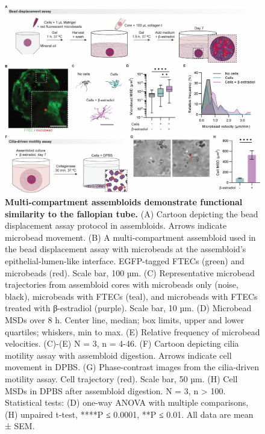 \begin{refsection}
    \begin{figure}[p]
        \begin{center}
            \includegraphics[width=1\textwidth,height=0.85\textheight,keepaspectratio,clip,page=1]{figures/chapter4/fig_4.jpg}
            \captionsetup{font=small}
            \caption{\textbf{Multi-compartment assembloids demonstrate functional similarity to the fallopian tube.} (A) Cartoon depicting the bead displacement assay protocol in assembloids. Arrows indicate microbead movement. (B) A multi-compartment assembloid used in the bead displacement assay with microbeads at the assembloid’s epithelial-lumen-like interface. EGFP-tagged FTECs (green) and microbeads (red). Scale bar, 100 µm. (C) Representative microbead trajectories from assembloid cores with microbeads only (noise, black), microbeads with FTECs (teal), and microbeads with FTECs treated with β-estradiol (purple). Scale bar, 10 µm. (D) Microbead MSDs over 8 h. Center line, median; box limits, upper and lower quartiles; whiskers, min to max. (E) Relative frequency of microbead velocities. (C)-(E) N = 3, n = 4-46. (F) Cartoon depicting cilia motility assay with assembloid digestion. Arrows indicate cell movement in DPBS. (G) Phase-contrast images from the cilia-driven motility assay. Cell trajectory (red). Scale bar, 50 µm. (H) Cell MSDs in DPBS after assembloid digestion. N = 3, n > 100. Statistical tests: (D) one-way ANOVA with multiple comparisons, (H) unpaired t-test, ****P ≤ 0.0001, **P ≤ 0.01. All data are mean ± SEM. }
            \label{chapter4_fig4}
        \end{center}
    \end{figure}
    

\end{refsection}
